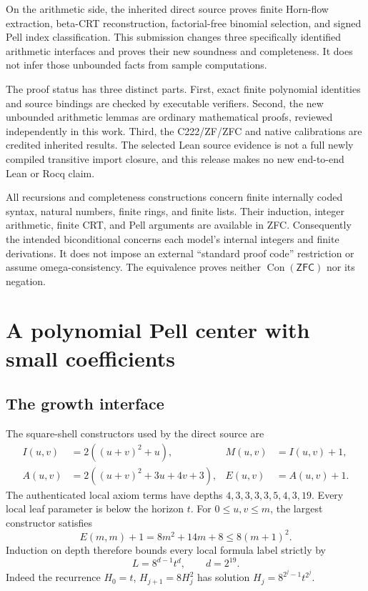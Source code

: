 \documentclass[10pt,letterpaper]{article}
\theoremstyle{remark}\newtheorem{remark}[theorem]{Remark}
\newcommand{\Con}{\operatorname{Con}}
\newcommand{\ZFC}{\mathsf{ZFC}}
\begin{document}
On the arithmetic side, the inherited direct source proves finite
Horn-flow extraction, beta-CRT reconstruction, factorial-free binomial
selection, and signed Pell index classification. This submission changes
three specifically identified arithmetic interfaces and proves their new
soundness and completeness. It does not infer those unbounded facts from
sample computations.

The proof status has three distinct parts. First, exact finite polynomial
identities and source bindings are checked by executable verifiers. Second,
the new unbounded arithmetic lemmas are ordinary mathematical proofs,
reviewed independently in this work. Third, the C222/ZF/ZFC and native
calibrations are credited inherited results. The selected Lean source
evidence is not a full newly compiled transitive import closure, and this
release makes no new end-to-end Lean or Rocq claim.

All recursions and completeness constructions concern finite internally
coded syntax, natural numbers, finite rings, and finite lists. Their
induction, integer arithmetic, finite CRT, and Pell arguments are available
in ZFC. Consequently the intended biconditional concerns each model's
internal integers and finite derivations. It does not impose an external
``standard proof code'' restriction or assume omega-consistency. The
equivalence proves neither $\Con(\ZFC)$ nor its negation.

\section{A polynomial Pell center with small coefficients}

\subsection{The growth interface}

The square-shell constructors used by the direct source are
\begin{align*}
 I(u,v)&=2((u+v)^2+u),& M(u,v)&=I(u,v)+1,\\
 A(u,v)&=2((u+v)^2+3u+4v+3),& E(u,v)&=A(u,v)+1.
\end{align*}
The authenticated local axiom terms have depths
$4,3,3,3,3,5,4,3,19$. Every local leaf parameter is below the horizon $t$.
For $0\le u,v\le m$, the largest constructor satisfies
\[
 E(m,m)+1=8m^2+14m+8\le8(m+1)^2.
\]
Induction on depth therefore bounds every local formula label strictly by
\begin{equation}\label{eq:labelbound}
 L=8^{d-1}t^d,\qquad d=2^{19}.
\end{equation}
Indeed the recurrence $H_0=t$, $H_{j+1}=8H_j^2$ has solution
$H_j=8^{2^j-1}t^{2^j}$.
\end{document}
